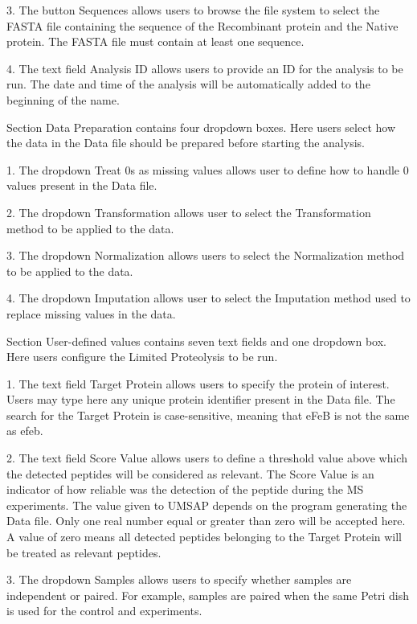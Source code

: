 \num{3}. The button Sequences allows users to browse the file system to select the
FASTA file containing the sequence of the Recombinant protein and the Native protein.
The FASTA file must contain at least one sequence.

\num{4}. The text field Analysis ID allows users to provide an ID for the analysis
to be run. The date and time of the analysis will be automatically added to the
beginning of the name.

Section Data Preparation contains four dropdown boxes. Here users select how the data
in the Data file should be prepared before starting the analysis.

\num{1}. The dropdown Treat \num{0}s as missing values allows user to define how
to handle \num{0} values present in the Data file.

\num{2}. The dropdown Transformation allows user to select the Transformation method
to be applied to the data.

\num{3}. The dropdown Normalization allows users to select the Normalization method
to be applied to the data.

\num{4}. The dropdown Imputation allows user to select the Imputation method used
to replace missing values in the data.

Section User-defined values contains seven text fields and one dropdown box. Here
users configure the Limited Proteolysis to be run.

\num{1}. The text field Target Protein\label{par:limprotTargetProtein} allows users
to specify the protein of interest. Users may type here any unique protein identifier
present in the Data file. The search for the Target Protein is case-sensitive, meaning
that eFeB is not the same as efeb.

\num{2}. The text field Score Value\label{par:limprotScoreValue} allows users to
define a threshold value above which the detected peptides will be considered as
relevant. The Score Value is an indicator of how reliable was the detection of the peptide
during the MS experiments. The value given to UMSAP depends on the program generating
the Data file. Only one real number equal or greater than zero will be accepted here.
A value of zero means all detected peptides belonging to the Target Protein will
be treated as relevant peptides.

\num{3}. The dropdown Samples allows users to specify whether samples are independent
or paired. For example, samples are paired when the same Petri dish is used for the
control and experiments.

